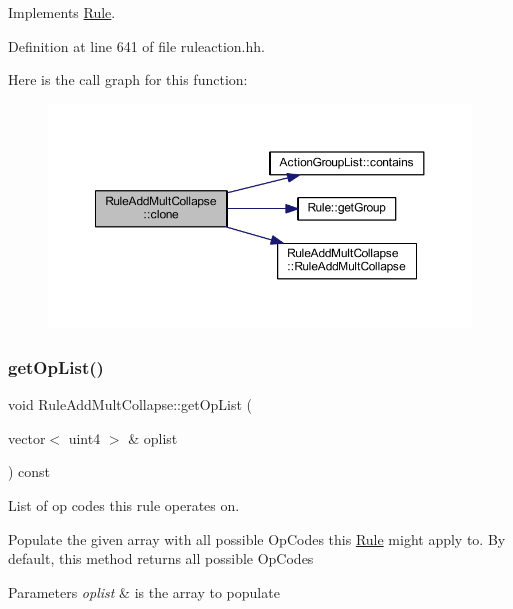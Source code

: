 Implements \mbox{\hyperlink{class_rule_a70de90a76461bfa7ea0b575ce3c11e4d}{Rule}}.



Definition at line 641 of file ruleaction.\+hh.

Here is the call graph for this function\+:
\nopagebreak
\begin{figure}[H]
\begin{center}
\leavevmode
\includegraphics[width=350pt]{class_rule_add_mult_collapse_a954a3e869a8c8946773f189d02482182_cgraph}
\end{center}
\end{figure}
\mbox{\label{class_rule_add_mult_collapse_a8398a59703c4741d98bf0e488c7fb4bb}} 
\subsubsection{\texorpdfstring{getOpList()}{getOpList()}}
{\footnotesize\ttfamily void Rule\+Add\+Mult\+Collapse\+::get\+Op\+List (\begin{DoxyParamCaption}\item[{vector$<$ uint4 $>$ \&}]{oplist }\end{DoxyParamCaption}) const\hspace{0.3cm}{\ttfamily [virtual]}}



List of op codes this rule operates on. 

Populate the given array with all possible Op\+Codes this \mbox{\hyperlink{class_rule}{Rule}} might apply to. By default, this method returns all possible Op\+Codes 
\begin{DoxyParams}{Parameters}
{\em oplist} & is the array to populate \\
\hline
\end{DoxyParams}


